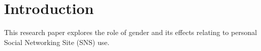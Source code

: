\section{Introduction}

This research paper explores the role of gender and its effects relating to personal Social Networking Site (SNS) use. 